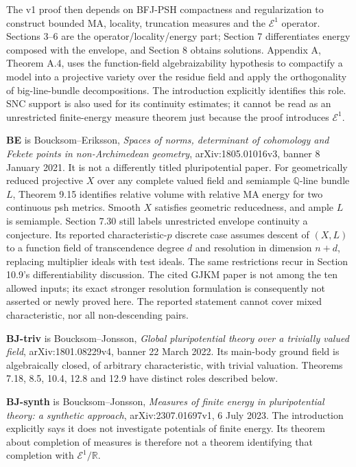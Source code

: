 \documentclass[
  11pt,
]{article}
\begin{document}
The v1 proof then depends on BFJ-PSH compactness and regularization to
construct bounded MA, locality, truncation measures and the
\(\mathcal E^1\) operator. Sections 3--6 are the
operator/locality/energy part; Section 7 differentiates energy composed
with the envelope, and Section 8 obtains solutions. Appendix A, Theorem
A.4, uses the function-field algebraizability hypothesis to compactify a
model into a projective variety over the residue field and apply the
orthogonality of big-line-bundle decompositions. The introduction
explicitly identifies this role. SNC support is also used for its
continuity estimates; it cannot be read as an unrestricted finite-energy
measure theorem just because the proof introduces \(\mathcal E^1\).

\textbf{BE} is Boucksom--Eriksson, \emph{Spaces of norms, determinant of
cohomology and Fekete points in non-Archimedean geometry},
arXiv:1805.01016v3, banner 8 January 2021. It is not a differently
titled pluripotential paper. For geometrically reduced projective \(X\)
over any complete valued field and semiample \(\mathbb Q\)-line bundle
\(L\), Theorem 9.15 identifies relative volume with relative MA energy
for two continuous psh metrics. Smooth \(X\) satisfies geometric
reducedness, and ample \(L\) is semiample. Section 7.30 still labels
unrestricted envelope continuity a conjecture. Its reported
characteristic-\(p\) discrete case assumes descent of \textbf{\((X,L)\)}
to a function field of transcendence degree \(d\) and resolution in
dimension \(n+d\), replacing multiplier ideals with test ideals. The
same restrictions recur in Section 10.9's differentiability discussion.
The cited GJKM paper is not among the ten allowed inputs; its exact
stronger resolution formulation is consequently not asserted or newly
proved here. The reported statement cannot cover mixed characteristic,
nor all non-descending pairs.

\textbf{BJ-triv} is Boucksom--Jonsson, \emph{Global pluripotential
theory over a trivially valued field}, arXiv:1801.08229v4, banner 22
March 2022. Its main-body ground field is algebraically closed, of
arbitrary characteristic, with trivial valuation. Theorems 7.18, 8.5,
10.4, 12.8 and 12.9 have distinct roles described below.

\textbf{BJ-synth} is Boucksom--Jonsson, \emph{Measures of finite energy
in pluripotential theory: a synthetic approach}, arXiv:2307.01697v1, 6
July 2023. The introduction explicitly says it does not investigate
potentials of finite energy. Its theorem about completion of measures is
therefore not a theorem identifying that completion with
\(\mathcal E^1/\mathbb R\).
\end{document}
